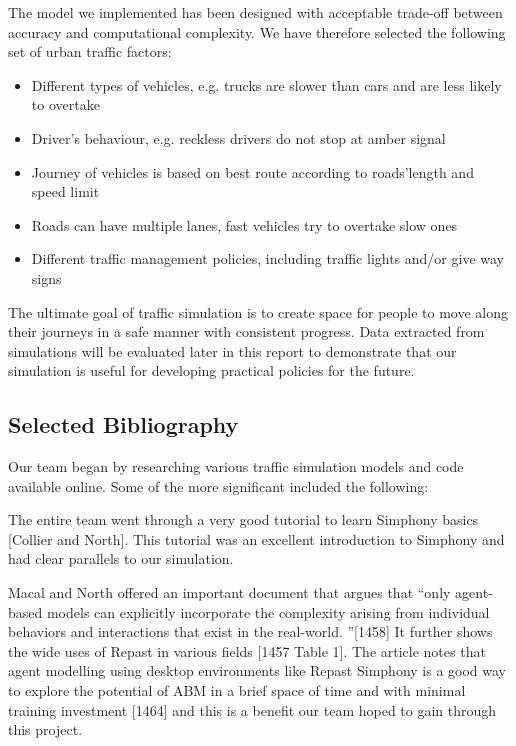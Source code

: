 \documentclass[11pt]{article}
\begin{document}
The model we implemented has been designed with acceptable trade-off between accuracy and computational complexity. We have therefore selected the following set of urban traffic factors:
\begin{itemize}\itemsep0pt
\item Different types of vehicles, e.g. trucks are slower than cars and are less likely to overtake
\item Driver\textquoteright s behaviour, e.g. reckless drivers do not stop at amber signal
\item Journey of vehicles is based on best route according to roads\textquoteright length and speed limit
\item Roads can have multiple lanes, fast vehicles try to overtake slow ones
\item Different traffic management policies, including traffic lights and/or give way signs
\end{itemize}

The ultimate goal of traffic simulation is to create space for people to move along their journeys in a safe manner with consistent progress. Data extracted from simulations will be evaluated later in this report to demonstrate that our simulation is useful for developing practical policies for the future.



\subsection{Selected Bibliography}

Our team began by researching various traffic simulation models and code available online. Some of the more significant included the following:

The entire team went through a very good tutorial to learn Simphony basics [Collier and North\cite{7g}]. This tutorial was an excellent introduction to Simphony and had clear parallels to our simulation. 

Macal and North\cite{5e} offered an important document that argues that \textquotedblleft only agent-based models can explicitly incorporate the complexity arising from individual behaviors and interactions that exist in the real-world. \textquotedblright [1458] It further shows the wide uses of Repast in various fields\cite{5e} [1457 Table 1]. The article notes that agent modelling using desktop environments like Repast Simphony is a good way to explore the potential of ABM in a brief space of time and with minimal training investment \cite{5e}[1464] and this is a benefit our team hoped to gain through this project. 
\end{document}
